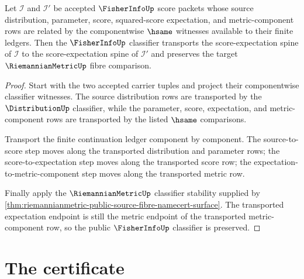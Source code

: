 \begin{theorem}
\label{thm:fisherinfo-classifier-transport-obligation}
Let $\mathcal{I}$ and $\mathcal{I}'$ be accepted $\FisherInfoUp$ score packets
whose source distribution, parameter, score, squared-score expectation, and
metric-component rows are related by the componentwise $\hsame$ witnesses
available to their finite ledgers. Then the $\FisherInfoUp$ classifier
transports the score-expectation spine of $\mathcal{I}$ to the
score-expectation spine of $\mathcal{I}'$ and preserves the target
$\RiemannianMetricUp$ fibre comparison.
\end{theorem}
\begin{proof}
Start with the two accepted carrier tuples and project their componentwise
classifier witnesses. The source distribution rows are transported by the
$\DistributionUp$ classifier, while the parameter, score, expectation, and
metric-component rows are transported by the listed $\hsame$ comparisons.

Transport the finite continuation ledger component by component. The
source-to-score step moves along the transported distribution and parameter
rows; the score-to-expectation step moves along the transported score row; the
expectation-to-metric-component step moves along the transported metric row.

Finally apply the $\RiemannianMetricUp$ classifier stability supplied by
\autoref{thm:riemannianmetric-public-source-fibre-namecert-surface}. The
transported expectation endpoint is still the metric endpoint of the
transported metric-component row, so the public $\FisherInfoUp$ classifier is
preserved.
\end{proof}

\section{The certificate}
\label{sec:fisherinfo-certificate}


